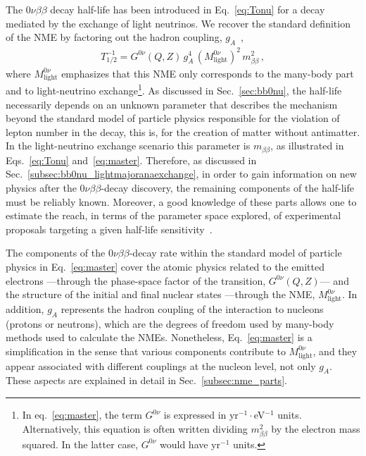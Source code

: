 
The $0\nu\beta\beta$ decay half-life has been introduced in Eq.~\eqref{eq:Tonu} for a decay mediated by the exchange of light neutrinos. We recover the standard definition of the NME by factoring out the hadron coupling, $g_A$~\cite{Engel:2016xgb,Agostini:2022zub},
\begin{align}
T_{1/2}^{-1} =  G^{0\nu}\left(Q,Z\right)\,g_A^4\,\left(M^{0\nu}_\text{light}\right)^2\,m^2_{\beta\beta}\,,
\label{eq:master}
\end{align}
where $M^{0\nu}_\text{light}$ emphasizes that this NME only corresponds to the many-body part and to light-neutrino exchange\footnote{In eq.~\ref{eq:master}, the term $G^{0\nu}$ is expressed in yr$^{-1}\cdot$eV$^{-1}$ units. Alternatively, this equation is often written dividing $m^2_{\beta\beta}$ by the electron mass squared. In the latter case, $G^{0\nu}$ would have yr$^{-1}$ units.}.
As discussed in Sec.~\ref{sec:bb0nu}, the half-life necessarily depends on an unknown parameter that describes the mechanism beyond the standard model of particle physics responsible for the violation of lepton number in the decay, this is, for the creation of matter without antimatter. In the light-neutrino exchange scenario this parameter is $m_{\beta\beta}$, as illustrated in Eqs.~\eqref{eq:Tonu} and~\eqref{eq:master}. Therefore, as discussed in Sec.~\ref{subsec:bb0nu_lightmajoranaexchange}, in order to gain information on new physics after the $0\nu\beta\beta$-decay discovery, the remaining components of the half-life must be reliably known. Moreover, a good knowledge of these parts allows one to estimate the reach, in terms of the parameter space explored, of experimental proposals targeting a given half-life sensitivity~\cite{Agostini:2021kba}.

The components of the $0\nu\beta\beta$-decay rate within the standard model of particle physics in Eq.~\eqref{eq:master} cover the atomic physics related to the emitted electrons ---through the phase-space factor of the transition, $G^{0\nu}\left(Q,Z\right)$--- and the structure of the initial and final nuclear states ---through the NME, $M^{0\nu}_\text{light}$. In addition, $g_A$ represents the hadron coupling of the interaction to nucleons (protons or neutrons), which are the degrees of freedom used by many-body methods used to calculate the NMEs.
Nonetheless, Eq.~\eqref{eq:master} is a simplification in the sense that various components contribute to $M^{0\nu}_\text{light}$, and they appear associated with different couplings at the nucleon level, not only $g_A$. These aspects are explained in detail in Sec.~\ref{subsec:nme_parts}.

